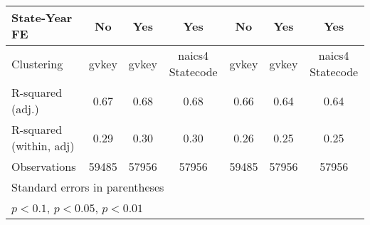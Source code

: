{\begin{tabular}{l*{6}{c}}
State-Year FE       &          No         &         Yes         &         Yes         &          No         &         Yes         &         Yes         \\
\midrule
Clustering          &       gvkey         &       gvkey         &naics4 Statecode         &       gvkey         &       gvkey         &naics4 Statecode         \\
R-squared (adj.)    &        0.67         &        0.68         &        0.68         &        0.66         &        0.64         &        0.64         \\
R-squared (within, adj)&        0.29         &        0.30         &        0.30         &        0.26         &        0.25         &        0.25         \\
Observations        &       59485         &       57956         &       57956         &       59485         &       57956         &       57956         \\
\bottomrule
\multicolumn{7}{l}{\footnotesize Standard errors in parentheses}\\
\multicolumn{7}{l}{\footnotesize \sym{*} \(p<0.1\), \sym{**} \(p<0.05\), \sym{***} \(p<0.01\)}\\
\end{tabular}
}
